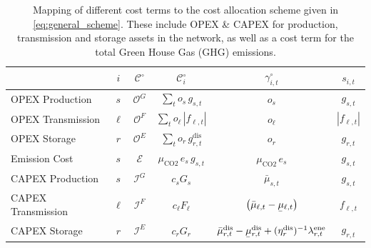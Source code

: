 \documentclass[11pt,twocolumn]{article}
\newcommand{\ubar}[1]{\underaccent{\bar}{#1}}
\newcommand{\state}{s_{i,t}}
\newcommand{\costfactor}{\gamma^\circ_{i,t}}
\newcommand{\generation}{g_{s,t}}
\newcommand{\capacitygeneration}{G_{s}}
\newcommand{\operationalpricegeneration}{o_{s}}
\newcommand{\capitalpricegeneration}{c_{s}}
\newcommand{\muuppergeneration}{\bar{\mu}_{s,t}}
\newcommand{\flow}{f_{\ell,t}}
\newcommand{\capacityflow}{F_{\ell}}
\newcommand{\operationalpriceflow}{o_\ell}
\newcommand{\capitalpriceflow}{c_{\ell}}
\newcommand{\mulowerflow}{\ubar{\mu}_{\ell,t}}
\newcommand{\muupperflow}{\bar{\mu}_{\ell,t}}
\newcommand{\storage}{g_{r,t}}
\newcommand{\storagedispatch}{\storage^\text{dis}}
\newcommand{\efficiency}{\eta_{r}}
\newcommand{\efficiencydispatch}{\efficiency^\text{dis}}
\newcommand{\operationalpricestorage}{o_r}
\newcommand{\capitalpricestorage}{c_r}
\newcommand{\capacitystorage}{G_r}
\newcommand{\mulowerstoragedispatch}{\ubar{\mu}_{r,t}^\text{dis}}
\newcommand{\muupperstoragedispatch}{\bar{\mu}_{r,t}^\text{dis}}
\newcommand{\mustateofcharge}{\lambda^\text{ene}_{r,t}}
\newcommand{\emission}{e_{s}}
\newcommand{\emissionprice}{\mu_{\text{CO2}}}
\newcommand{\cost}[1][\circ]{\mathcal{C}^{#1}}
\newcommand{\opexgeneration}{\mathcal{O}^G}
\newcommand{\opexflow}{\mathcal{O}^F}
\newcommand{\opexstorage}{\mathcal{O}^E}
\newcommand{\capexgeneration}{\mathcal{I}^G}
\newcommand{\capexflow}{\mathcal{I}^F}
\newcommand{\capexstorage}{\mathcal{I}^E}
\newcommand{\emissioncost}{\mathcal{E}}
\begin{document}
\begin{table}[t]
    \begin{center}
        \begin{tabular}{l|c|c|c|c|c}
        & $i$ & $\cost$ & $\cost_i$  & $\costfactor$ & $\state$  \\
        \toprule 
        OPEX Production & $s$ & $\opexgeneration$ & $\sum_{t} \operationalpricegeneration \, \generation$   & $\operationalpricegeneration$ & $\generation$ \\  
        OPEX Transmission  & $\ell$ & $\opexflow$ & $\sum_{t} \operationalpriceflow \, |\flow|  $ & $\operationalpriceflow$ & $|\flow|$ \\  
        OPEX Storage & $r$  & $\opexstorage$ & $\sum_{t} \operationalpricestorage \, \storagedispatch$ &  $\operationalpricestorage$ & $\storage$ \\
        \midrule
        Emission Cost & $s$ & $\emissioncost$ & $ \emissionprice \, \emission \, \generation$ & $\emissionprice \,\emission$ & $\generation$ \\
        \midrule   
        CAPEX Production & $s$ & $\capexgeneration$ & $ \capitalpricegeneration \capacitygeneration$ & $\muuppergeneration$ & $\generation$ \\
        CAPEX Transmission & $\ell$ & $\capexflow$ & $ \capitalpriceflow \capacityflow$ & $\left(\muupperflow - \mulowerflow \right)$ & $\flow$ \\
        CAPEX Storage & $r$ & $\capexstorage$ & $ \capitalpricestorage \capacitystorage$ & $ \muupperstoragedispatch - \mulowerstoragedispatch  + (\efficiencydispatch )^{-1} \mustateofcharge $ & $\storage$ \\
    \end{tabular}
    \end{center}
    \caption{Mapping of different cost terms to the cost allocation scheme given in \cref{eq:general_scheme}. These include OPEX \& CAPEX for production, transmission and storage assets in the network, as well as a cost term for the total Green House Gas (GHG) emissions.}
    \label{tab:cost_allocation_map}
\end{table}
\end{document}
